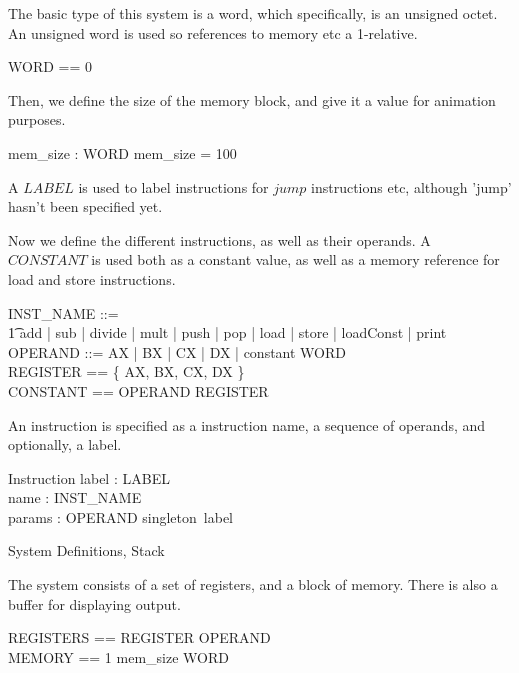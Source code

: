 \documentclass{article}
\begin{document}
The basic type of this system is a word, which specifically, is an
unsigned octet. An unsigned word is used so references to memory etc a
1-relative.

\begin{zed}
  WORD == 0 
\end{zed}

Then, we define the size of the memory block, and give it a value for
animation purposes.

\begin{axdef}
  mem\_size : WORD
\where
  mem\_size = 100
\end{axdef}

A $LABEL$ is used to label instructions for $jump$ instructions etc,
although 'jump' hasn't been specified yet.

\begin{zed}
  [LABEL]
\end{zed}

Now we define the different instructions, as well as their operands. A
$CONSTANT$ is used both as a constant value, as well as a memory
reference for load and store instructions.

\begin{zed}
  INST\_NAME ::= \\
    \t1 add | sub | divide | mult | push | pop |
      load | store | loadConst | print \\
  OPERAND ::= AX | BX | CX | DX | constant \ldata WORD \rdata\\
  REGISTER == \{ AX, BX, CX, DX \}\\
  CONSTANT == OPERAND \setminus REGISTER
\end{zed}

An instruction is specified as a instruction name, a sequence of
operands, and optionally, a label.

\begin{schema}{Instruction}
  label : \power LABEL \\
  name : INST\_NAME \\
  params : \seq OPERAND
\where
  singleton~label
\end{schema}

\begin{zsection}
  \SECTION System \parents Definitions, Stack
\end{zsection}

The system consists of a set of registers, and a block of
memory. There is also a buffer for displaying output.

\begin{zed}
  REGISTERS == REGISTER \fun OPERAND\\
  MEMORY == 1 \upto mem\_size \pfun WORD    
\end{zed}
\end{document}
